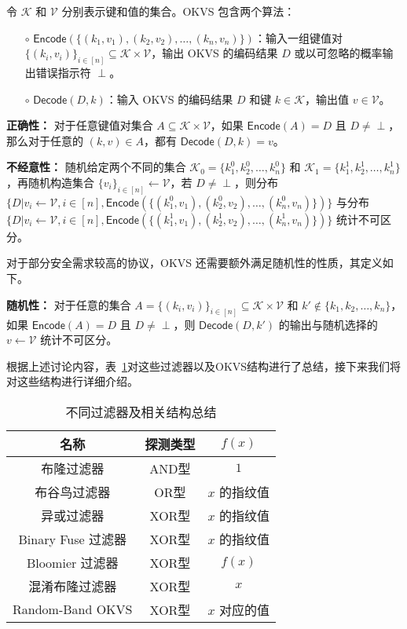 \begin{definition}\label{def:okvs}
    令 $\mathcal{K}$ 和 $\mathcal{V}$ 分别表示键和值的集合。OKVS 包含两个算法：
    \begin{itemize}
        \item[$\circ$] $\mathsf{Encode}(\{(k_1, v_1), (k_2, v_2), \dots, (k_n, v_n)\})$：输入一组键值对 $\{(k_i, v_i)\}_{i\in [n]}\subseteq \mathcal{K} \times \mathcal{V}$，输出 OKVS 的编码结果 $D$ 或以可忽略的概率输出错误指示符 $\perp$。
        \item[$\circ$] $\mathsf{Decode}(D, k)$：输入 OKVS 的编码结果 $D$ 和键 $k\in \mathcal{K}$，输出值 $v\in \mathcal{V}$。
    \end{itemize}

    \textbf{正确性：} 对于任意键值对集合 $A\subseteq \mathcal{K}\times \mathcal{V}$，如果 $\mathsf{Encode}(A) = D$ 且 $D\neq \perp$，那么对于任意的 $(k, v) \in A$，都有 $\mathsf{Decode}(D, k) = v$。

    \textbf{不经意性：} 随机给定两个不同的集合 $\mathcal{K}_0 = \{k_1^0, k_2^0, \dots, k_n^0\}$ 和 $\mathcal{K}_1 = \{k_1^1, k_2^1, \dots, k_n^1\}$，再随机构造集合 $\{v_i\}_{i\in [n]}\gets \mathcal{V}$，若 $D \neq \perp$，则分布 $\{D | v_i \gets \mathcal{V}, i\in [n], \mathsf{Encode}(\{(k_1^0, v_1), (k_2^0, v_2), \dots, (k_n^0, v_n)\})\}$ 与分布 $\{D | v_i \gets \mathcal{V}, i\in [n], \mathsf{Encode}(\{(k_1^1, v_1), (k_2^1, v_2), \dots, (k_n^1, v_n)\})\}$ 统计不可区分。

    对于部分安全需求较高的协议，OKVS 还需要额外满足随机性的性质，其定义如下。

    \textbf{随机性：} 对于任意的集合 $A = \{(k_i, v_i)\}_{i\in [n]} \subseteq \mathcal{K} \times \mathcal{V}$ 和 $k' \notin \{k_1, k_2, \dots, k_n\}$，如果 $\mathsf{Encode}(A) = D$ 且 $D\neq \perp$，则 $\mathsf{Decode}(D, k')$ 的输出与随机选择的 $v\gets \mathcal{V}$ 统计不可区分。
\end{definition}

根据上述讨论内容，表~\ref{tab:construct}对这些过滤器以及OKVS结构进行了总结，接下来我们将对这些结构进行详细介绍。

\begin{table}
  \centering
  \caption{不同过滤器及相关结构总结}
  \label{tab:construct}
  \begin{tabular}{ccc}
    \toprule
    名称  &  探测类型  &  $f(x)$  \\
    \midrule
    布隆过滤器  &  AND型  &  $1$  \\
    布谷鸟过滤器  &  OR型  &  $x$ 的指纹值  \\
    异或过滤器  &  XOR型  &  $x$ 的指纹值  \\
    Binary Fuse 过滤器  & XOR型  &  $x$ 的指纹值  \\
    Bloomier 过滤器  &  XOR型  &  $f(x)$  \\
    混淆布隆过滤器  &  XOR型  &  $x$  \\
    Random-Band OKVS &  XOR型  &  $x$ 对应的值  \\
    \bottomrule
  \end{tabular}
\end{table}
